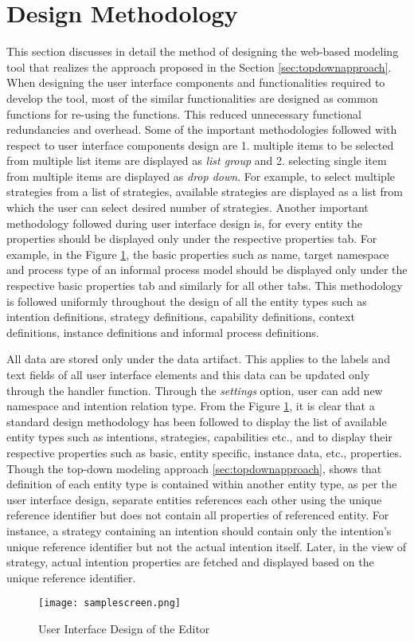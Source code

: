 \section{Design Methodology}
\label{sec:designmethodology}
This section discusses in detail the method of designing the web-based modeling tool that realizes the approach proposed in the Section \ref{sec:topdownapproach}. When designing the user interface components and functionalities required to develop the tool, most of the similar functionalities are designed as common functions for re-using the functions. This reduced unnecessary functional redundancies and overhead. Some of the important methodologies followed with respect to user interface components design are 1. multiple items to be selected from multiple list items are displayed as \textit{list group} and 2. selecting single item from multiple items are displayed as \textit{drop down}. For example, to select multiple strategies from a list of strategies, available strategies are displayed as a list from which the user can select desired number of strategies. Another important methodology followed during user interface design is, for every entity the properties should be displayed only under the respective properties tab. For example, in the Figure \ref{fig:samplescreen}, the basic properties such as name, target namespace and process type of an informal process model should be displayed only under the respective basic properties tab and similarly for all other tabs. This methodology is followed uniformly throughout the design of all the entity types such as intention definitions, strategy definitions, capability definitions, context definitions, instance definitions and informal process definitions. 

All data are stored only under the data artifact. This applies to the labels and text fields of all user interface elements and this data can be updated only through the handler function. Through the \textit{settings} option, user can add new namespace and intention relation type. From the Figure \ref{fig:samplescreen}, it is clear that a standard design methodology has been followed to display the list of available entity types such as intentions, strategies, capabilities etc., and to display their respective properties such as basic, entity specific, instance data, etc., properties. Though the top-down modeling approach \ref{sec:topdownapproach}, shows that definition of each entity type is contained within another entity type, as per the user interface design, separate entities references each other using the unique reference identifier but does not contain all properties of referenced entity. For instance, a strategy containing an intention should contain only the intention's unique reference identifier but not the actual intention itself. Later, in the view of strategy, actual intention properties are fetched and displayed based on the unique reference identifier. 

\begin{figure}
	\centering
	\texttt{[image: samplescreen.png]}
	\caption{User Interface Design of the Editor}
	\label{fig:samplescreen}
\end{figure}



